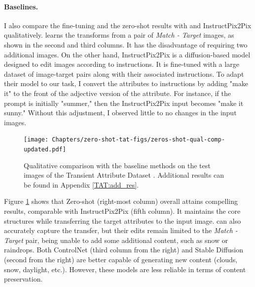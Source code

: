 \paragraph{Baselines.} I also compare the fine-tuning and the zero-shot results with \citeauthor{laffont2014transient} \cite{laffont2014transient} and InstructPix2Pix \cite{brooks2023instructpix2pix} qualitatively. \citeauthor{laffont2014transient} \cite{laffont2014transient} learns the transforms from a pair of \textit{ Match - Target} images, as shown in the second and third columns. It has the disadvantage of requiring two additional images. On the other hand, InstructPix2Pix \cite{brooks2023instructpix2pix} is a diffusion-based model designed to edit images according to instructions. It is fine-tuned with a large dataset of image-target pairs along with their associated instructions. To adapt their model to our task, I convert the attributes to instructions by adding "make it" to the front of the adjective version of the attribute. For instance, if the prompt is initially "summer," then the InstructPix2Pix input becomes "make it sunny." Without this adjustment, I observed little to no changes in the input images.


 
 \begin{figure}[ht]
  \texttt{[image: Chapters/zero-shot-tat-figs/zeros-shot-qual-comp-updated.pdf]}
  \caption{Qualitative comparison with the baseline methods on the test images of the Transient Attribute Dataset \cite{laffont2014transient}. Additional results can be found in Appendix \ref{TAT:add_res}.}
  \label{fig:zero-shot-comparison}
\end{figure}

Figure \ref{fig:zero-shot-comparison} shows that Zero-shot (right-most column) overall attains compelling results, comparable with InstructPix2Pix (fifth column). It maintains the core structures while transferring the target attributes to the input image. \citeauthor{laffont2014transient} \cite{laffont2014transient} can also accurately capture the transfer, but their edits remain limited to the \textit{Match - Target} pair, being unable to add some additional content, such as snow or raindrops. Both ControlNet (third column from the right) and Stable Diffusion (second from the right) are better capable of generating new content (clouds, snow, daylight, etc.). However, these models are less reliable in terms of content preservation. 

